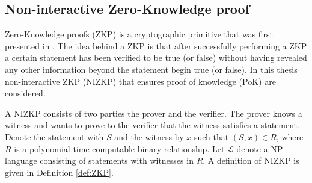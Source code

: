 \subsection*{Non-interactive Zero-Knowledge proof}
Zero-Knowledge proofs (ZKP) is a cryptographic primitive that was first presented in \cite{OG_ZKP}. The idea behind a ZKP is that after successfully performing a ZKP a certain statement has been verified to be true (or false) without having revealed any other information beyond the statement begin true (or false). In this thesis non-interactive ZKP (NIZKP) that ensures proof of knowledge (PoK) are considered.  %


A NIZKP consists of two parties the prover  and the verifier. The prover knows a witness and wants to prove to the verifier that the witness satisfies a statement. Denote the statement with $S$ and the witness by $x$ such that $(S,x)\in R$, where $R$ is a polynomial time computable binary relationship.  Let $\mathcal{L}$ denote a NP language consisting of statements with witnesses in $R$. A  definition of  NIZKP is given in Definition \ref{def:ZKP}. 
 





